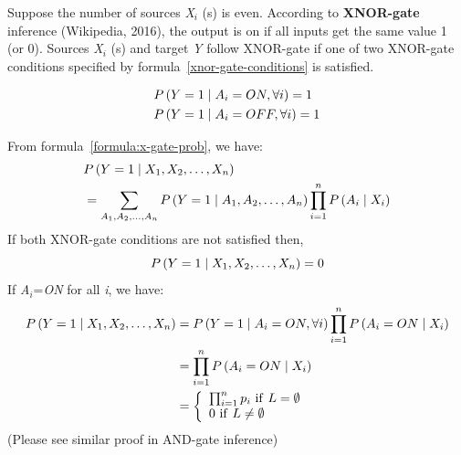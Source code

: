 \documentclass{article}
\numberwithin{equation}{section}
\numberwithin{figure}{section}
\numberwithin{table}{section}
\begin{document}
Suppose the number of sources \textit{X${}_{i}$} (s) is even. According to \textbf{XNOR-gate} inference (Wikipedia, 2016), the output is on if all inputs get the same value 1 (or 0). Sources \textit{X${}_{i}$} (s) and target \textit{Y} follow XNOR-gate if one of two XNOR-gate conditions specified by formula~\ref{xnor-gate-conditions} is satisfied.

\begin{equation}
\begin{split}
&P\left(Y=1\mathrel{\left|\vphantom{Y=1 A_i=ON,\forall i}\right.\kern-\nulldelimiterspace}A_i=ON,\forall i\right)=1\\
&P\left(Y=1\mathrel{\left|\vphantom{Y=1 A_i=OFF,\forall i}\right.\kern-\nulldelimiterspace}A_i=OFF,\forall i\right)=1
\end{split}
\label{xnor-gate-conditions}
\end{equation}

From formula~\ref{formula:x-gate-prob}, we have:
\begin{align*}
&P\left(Y=1\mathrel{\left|\vphantom{Y=1 X_1,X_2,\dots ,X_n}\right.\kern-\nulldelimiterspace}X_1,X_2,\dots ,X_n\right)\\
&=\sum_{A_1,A_2,\dots ,A_n}{P\left(Y=1\mathrel{\left|\vphantom{Y=1 A_1,A_2,\dots ,A_n}\right.\kern-\nulldelimiterspace}A_1,A_2,\dots ,A_n\right)\prod^n_{i=1}{P\left(A_i\mathrel{\left|\vphantom{A_i X_i}\right.\kern-\nulldelimiterspace}X_i\right)}}
\end{align*}
If both XNOR-gate conditions are not satisfied then,
\[P\left(Y=1\mathrel{\left|\vphantom{Y=1 X_1,X_2,\dots ,X_n}\right.\kern-\nulldelimiterspace}X_1,X_2,\dots ,X_n\right)=0\] 
If \textit{A${}_{i}$}=\textit{ON} for all \textit{i}, we have:
\begin{align*}
P\left(Y=1\mathrel{\left|\vphantom{Y=1 X_1,X_2,\dots ,X_n}\right.\kern-\nulldelimiterspace}X_1,X_2,\dots ,X_n\right)&=P\left(Y=1\mathrel{\left|\vphantom{Y=1 A_i=ON,\forall i}\right.\kern-\nulldelimiterspace}A_i=ON,\forall i\right)\prod^n_{i=1}{P\left(A_i=ON\mathrel{\left|\vphantom{A_i=ON X_i}\right.\kern-\nulldelimiterspace}X_i\right)}\\
&=\prod^n_{i=1}{P\left(A_i=ON\mathrel{\left|\vphantom{A_i=ON X_i}\right.\kern-\nulldelimiterspace}X_i\right)}\\
&=\left\{ \begin{array}{l}
\prod^n_{i=1}{p_i}\ \mathrm{if\ }L=\emptyset  \\ 
0\ \mathrm{if\ }L\neq \emptyset  \end{array}
\right.
\end{align*}
(Please see similar proof in AND-gate inference)
\end{document}

